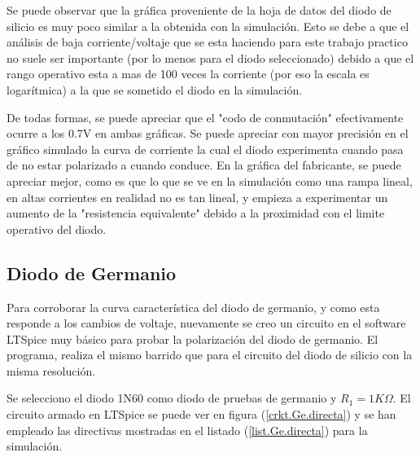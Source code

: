 \documentclass[chaptersright]{informeutn}
\begin{document}
        Se puede observar que la gráfica proveniente de la hoja de datos del diodo de silicio \cite{DS0} es muy poco
        similar a la obtenida con la simulación. Esto se debe a que el análisis de baja corriente/voltaje que se esta
        haciendo para este trabajo practico no suele ser importante (por lo menos para el diodo seleccionado) debido a
        que el rango operativo esta a mas de 100 veces la corriente (por eso la escala es logarítmica) a la que se
        sometido el diodo en la simulación.

        De todas formas, se puede apreciar que el "codo de conmutación" efectivamente ocurre a los 0.7V en ambas
        gráficas. Se puede apreciar con mayor precisión en el gráfico simulado la curva de corriente la cual
        el diodo experimenta cuando pasa de no estar polarizado a cuando conduce. En la gráfica del fabricante, se
        puede apreciar mejor, como es que lo que se ve en la simulación como una rampa lineal, en altas
        corrientes en realidad no es tan lineal, y empieza a experimentar un aumento de la "resistencia equivalente"
        debido a la proximidad con el limite operativo del diodo.

      \subsection{Diodo de Germanio}
        Para corroborar la curva característica del diodo de germanio, y como esta responde a los cambios de voltaje,
        nuevamente se creo un circuito en el software LTSpice muy básico para probar la polarización del diodo de
        germanio. El programa, realiza el mismo barrido que para el circuito del diodo de silicio con la misma
        resolución.

        Se selecciono el diodo 1N60 como diodo de pruebas de germanio y $R_1 = 1K\Omega$. El circuito armado en
        LTSpice se puede ver en figura (\ref{crkt.Ge.directa}) y se han empleado las directivas mostradas en el
        listado (\ref{list.Ge.directa}) para la simulación.
\end{document}
